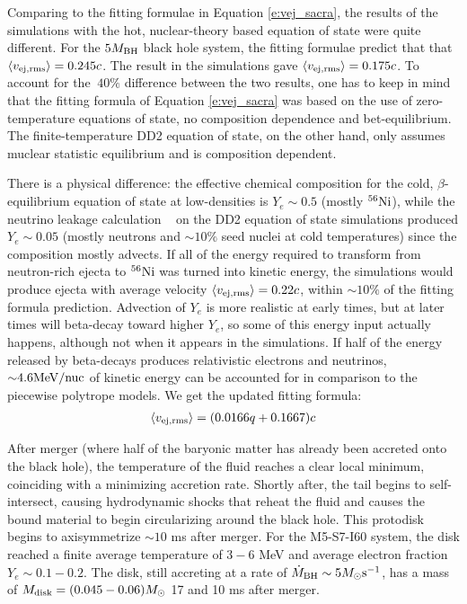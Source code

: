 Comparing to the fitting formulae in Equation \ref{e:vej_sacra}, the results of the simulations with the hot, nuclear-theory based equation of state were quite different.  
For the $5 M_{\rm BH}$ black hole system, the fitting formulae predict that that 
$\left\langle v_{\rm ej, rms} \right\rangle = 0.245 c$.
The result in the \SpEC simulations gave $\left\langle v_{\rm ej, rms} \right\rangle = 0.175 c$.
To account for the $~40 \%$ difference between the two results, one has to keep in mind that the fitting formula of  Equation \ref{e:vej_sacra} was based on the use of zero-temperature equations of state, no composition dependence and bet-equilibrium.
The finite-temperature DD2 equation of state, on the other hand, only assumes muclear statistic equilibrium and is composition dependent.  

There is a physical difference: the effective chemical composition for the cold, $\beta$-equilibrium equation of state at low-densities is $Y_e \sim 0.5$ (mostly $^{56}{\rm Ni}$), while the neutrino leakage calculation ~\cite{Ruffert1996,Rosswog:2003rv,OConnor2010} on the DD2 equation of state simulations produced $Y_e \sim 0.05$ (mostly neutrons and $\sim 10\%$ seed nuclei at cold temperatures) since the composition mostly advects.
If all of the energy required to transform from neutron-rich ejecta to $^{56}{\rm Ni}$ was turned into kinetic energy, the simulations would produce ejecta with average velocity $\left\langle v_{\rm ej, rms} \right\rangle = 0.22 c$, within $\sim 10\%$ of the fitting formula prediction.
Advection of $Y_e$ is more realistic at early times, but at later times will beta-decay toward higher $Y_e$, so some of this energy input actually happens, although not when it appears in the \SACRA simulations.
If half of the energy released by beta-decays produces relativistic electrons and neutrinos, $\mathord{\sim} 4.6 {\rm MeV/nuc}$ of kinetic energy can be accounted for in comparison to the piecewise polytrope models.
We get the updated fitting formula:
\begin{align}
\label{e:vej_spec}
\left\langle v_{\rm ej, rms} \right\rangle = (0.0166 q + 0.1667) c
\end{align}


After merger (where half of the baryonic matter has already been accreted onto the black hole), the temperature of the fluid reaches a clear local minimum, coinciding with a minimizing accretion rate.  Shortly after, the tail begins to self-intersect, causing hydrodynamic shocks that reheat the fluid and causes the bound material to begin circularizing around the black hole.  
This protodisk begins to axisymmetrize $\sim 10$ ms after merger.  
For the M5-S7-I60 system, the disk reached a finite average temperature of $3 - 6$ MeV and average electron fraction $Y_e \sim 0.1 - 0.2$.  The disk, still accreting at a rate of $\dot{M}_{\rm BH} \sim 5 M_\odot {\rm s}^{-1}$, has a mass of $M_{\rm disk} = (0.045 - 0.06) M_\odot$ 17 and 10 ms after merger.

